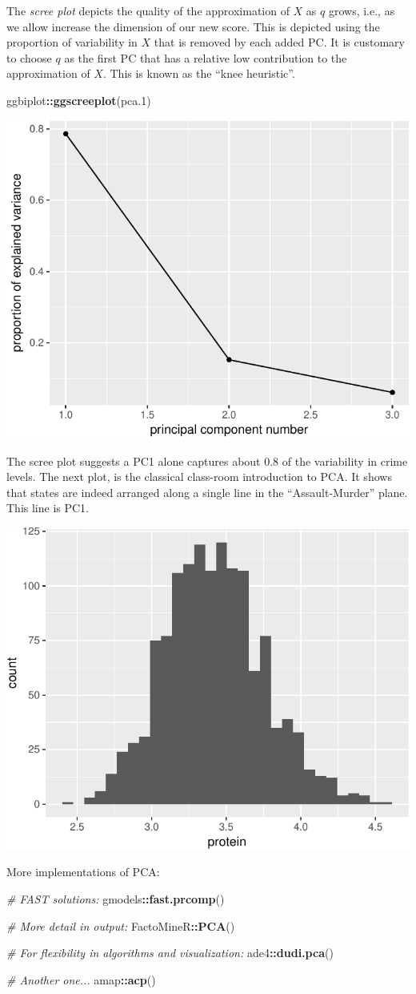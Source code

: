 \documentclass[]{book}
\newenvironment{Shaded}{\begin{snugshade}}{\end{snugshade}}
\newcommand{\CommentTok}[1]{\textcolor[rgb]{0.56,0.35,0.01}{\textit{#1}}}
\newcommand{\FloatTok}[1]{\textcolor[rgb]{0.00,0.00,0.81}{#1}}
\newcommand{\KeywordTok}[1]{\textcolor[rgb]{0.13,0.29,0.53}{\textbf{#1}}}
\newcommand{\NormalTok}[1]{#1}
\newcommand{\OperatorTok}[1]{\textcolor[rgb]{0.81,0.36,0.00}{\textbf{#1}}}
\theoremstyle{definition}
\theoremstyle{definition}
\theoremstyle{definition}
\theoremstyle{remark}
\begin{document}
The \emph{scree plot} depicts the quality of the approximation of \(X\) as \(q\) grows, i.e., as we allow increase the dimension of our new score.
This is depicted using the proportion of variability in \(X\) that is removed by each added PC.
It is customary to choose \(q\) as the first PC that has a relative low contribution to the approximation of \(X\).
This is known as the ``knee heuristic''.

\begin{Shaded}
\begin{Highlighting}[]
\NormalTok{ggbiplot}\OperatorTok{::}\KeywordTok{ggscreeplot}\NormalTok{(pca}\FloatTok{.1}\NormalTok{)}
\end{Highlighting}
\end{Shaded}

\includegraphics[width=0.5\linewidth]{Rcourse_files/figure-latex/scree-1}

The scree plot suggests a PC1 alone captures about 0.8 of the variability in crime levels.
The next plot, is the classical class-room introduction to PCA.
It shows that states are indeed arranged along a single line in the ``Assault-Murder'' plane. This line is PC1.

\includegraphics[width=0.5\linewidth]{Rcourse_files/figure-latex/unnamed-chunk-236-1}

More implementations of PCA:

\begin{Shaded}
\begin{Highlighting}[]
\CommentTok{# FAST solutions:}
\NormalTok{gmodels}\OperatorTok{::}\KeywordTok{fast.prcomp}\NormalTok{()}

\CommentTok{# More detail in output:}
\NormalTok{FactoMineR}\OperatorTok{::}\KeywordTok{PCA}\NormalTok{()}

\CommentTok{# For flexibility in algorithms and visualization:}
\NormalTok{ade4}\OperatorTok{::}\KeywordTok{dudi.pca}\NormalTok{()}

\CommentTok{# Another one...}
\NormalTok{amap}\OperatorTok{::}\KeywordTok{acp}\NormalTok{()}
\end{Highlighting}
\end{Shaded}
\end{document}
